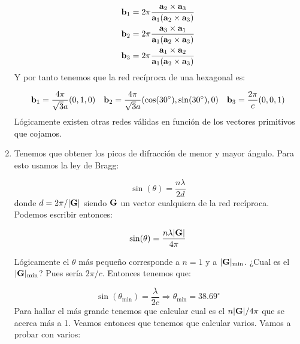 \begin{solucion}
\begin{enumerate}[label=\alph*)]
		\begin{equation*}
			\begin{split}    
				\mathbf{b}_1 & = 2 \pi \frac{\mathbf{a}_2 \times \mathbf{a}_3}{\mathbf{a}_1 (\mathbf{a}_2 \times \mathbf{a}_3)} \\
				\mathbf{b}_2 & = 2 \pi \frac{\mathbf{a}_3 \times \mathbf{a}_1}{\mathbf{a}_1 (\mathbf{a}_2 \times \mathbf{a}_3)}  \\
				\mathbf{b}_3 & = 2 \pi \frac{\mathbf{a}_1 \times \mathbf{a}_2}{\mathbf{a}_1 (\mathbf{a}_2 \times \mathbf{a}_3)}
			\end{split} \label{Ec:02-01-04}
		\end{equation*}
		Y por tanto tenemos que la red recíproca de una hexagonal es:
		
		\begin{equation*}
			\mathbf{b}_1 =  \frac{4 \pi}{\sqrt{3}a} (0,1,0) \quad
			\mathbf{b}_2 =  \frac{4 \pi}{\sqrt{3}a} (\cos(30^\circ),\sin(30^\circ),0) \quad
			\mathbf{b}_3 = \frac{2 \pi }{c} (0,0,1)
		\end{equation*}
		Lógicamente existen otras redes válidas en función de los vectores primitivos que cojamos.
		\item Tenemos que obtener los picos de difracción de menor y mayor ángulo. Para esto usamos la ley de Bragg:
		
		\begin{equation*}
			\sin (\theta) = \frac{n\lambda}{2d}
		\end{equation*}
		donde $d=2\pi / |\mathbf{G}|$ siendo $\mathbf{G}$ un vector cualquiera de la red recíproca. Podemos escribir entonces:
		
		\begin{equation*}
			\sin (\theta) = \frac{n\lambda |\mathbf{G}|}{4\pi}
		\end{equation*}
		
		
		 Lógicamente el $\theta$ más pequeño corresponde a $n=1$ y a $|\mathbf{G}|_{\min}$. ¿Cual es el $|\mathbf{G}|_{\min}$? Pues sería $2\pi/c$. Entonces tenemos que:
		
		\begin{equation}
			\sin (\theta_{\min}) = \frac{\lambda}{2c} \Rightarrow  \theta_{\min} = 38.69^\circ
		\end{equation}
		Para hallar el más grande tenemos que calcular cual es el $n|\mathbf{G}|/4\pi$ que se acerca más a 1. Veamos entonces que tenemos que calcular varios. Vamos a probar con varios:
		

\end{enumerate}
\end{solucion}
